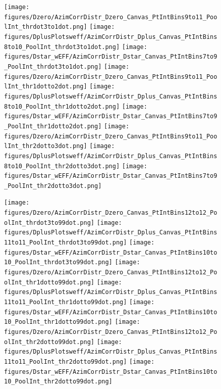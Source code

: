 \begin{figure}[!htbp]
\centering
{\texttt{[image: figures/Dzero/AzimCorrDistr\_Dzero\_Canvas\_PtIntBins9to11\_PoolInt\_thrdot3to1dot.png]}} 
{\texttt{[image: figures/DplusPlotsweff/AzimCorrDistr\_Dplus\_Canvas\_PtIntBins8to10\_PoolInt\_thrdot3to1dot.png]}} 
{\texttt{[image: figures/Dstar\_wEFF/AzimCorrDistr\_Dstar\_Canvas\_PtIntBins7to9\_PoolInt\_thrdot3to1dot.png]}}
{\texttt{[image: figures/Dzero/AzimCorrDistr\_Dzero\_Canvas\_PtIntBins9to11\_PoolInt\_thr1dotto2dot.png]}} 
{\texttt{[image: figures/DplusPlotsweff/AzimCorrDistr\_Dplus\_Canvas\_PtIntBins8to10\_PoolInt\_thr1dotto2dot.png]}} 
{\texttt{[image: figures/Dstar\_wEFF/AzimCorrDistr\_Dstar\_Canvas\_PtIntBins7to9\_PoolInt\_thr1dotto2dot.png]}}
{\texttt{[image: figures/Dzero/AzimCorrDistr\_Dzero\_Canvas\_PtIntBins9to11\_PoolInt\_thr2dotto3dot.png]}} 
{\texttt{[image: figures/DplusPlotsweff/AzimCorrDistr\_Dplus\_Canvas\_PtIntBins8to10\_PoolInt\_thr2dotto3dot.png]}} 
{\texttt{[image: figures/Dstar\_wEFF/AzimCorrDistr\_Dstar\_Canvas\_PtIntBins7to9\_PoolInt\_thr2dotto3dot.png]}}

{\texttt{[image: figures/Dzero/AzimCorrDistr\_Dzero\_Canvas\_PtIntBins12to12\_PoolInt\_thrdot3to99dot.png]}} 
{\texttt{[image: figures/DplusPlotsweff/AzimCorrDistr\_Dplus\_Canvas\_PtIntBins11to11\_PoolInt\_thrdot3to99dot.png]}} 
{\texttt{[image: figures/Dstar\_wEFF/AzimCorrDistr\_Dstar\_Canvas\_PtIntBins10to10\_PoolInt\_thrdot3to99dot.png]}} 
{\texttt{[image: figures/Dzero/AzimCorrDistr\_Dzero\_Canvas\_PtIntBins12to12\_PoolInt\_thr1dotto99dot.png]}} 
{\texttt{[image: figures/DplusPlotsweff/AzimCorrDistr\_Dplus\_Canvas\_PtIntBins11to11\_PoolInt\_thr1dotto99dot.png]}} 
{\texttt{[image: figures/Dstar\_wEFF/AzimCorrDistr\_Dstar\_Canvas\_PtIntBins10to10\_PoolInt\_thr1dotto99dot.png]}}
{\texttt{[image: figures/Dzero/AzimCorrDistr\_Dzero\_Canvas\_PtIntBins12to12\_PoolInt\_thr2dotto99dot.png]}} 
{\texttt{[image: figures/DplusPlotsweff/AzimCorrDistr\_Dplus\_Canvas\_PtIntBins11to11\_PoolInt\_thr2dotto99dot.png]}} 
{\texttt{[image: figures/Dstar\_wEFF/AzimCorrDistr\_Dstar\_Canvas\_PtIntBins10to10\_PoolInt\_thr2dotto99dot.png]}}
\end{figure}

